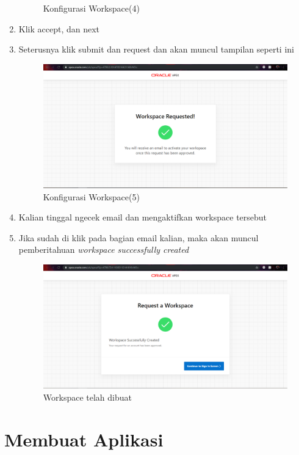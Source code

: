 \documentclass{article}
\begin{document}
\begin{enumerate}
\begin{figure}[!htbp]
        \caption{Konfigurasi Workspace(4)}
    \end{figure}
\newpage
    \item Klik accept, dan next
    \item Seterusnya klik submit dan request dan akan muncul tampilan seperti ini
    \begin{figure}[!htbp]
        \centering
        \includegraphics[scale=0.3]{figure/6.PNG}
        \caption{Konfigurasi Workspace(5)}
    \end{figure}
    \item Kalian tinggal ngecek email dan mengaktifkan workspace tersebut
    \item Jika sudah di klik pada bagian email kalian, maka akan muncul pemberitahuan \textit{workspace successfully created}
    \begin{figure}[!htbp]
        \centering
        \includegraphics[scale=0.3]{figure/7.PNG}
        \caption{Workspace telah dibuat}
    \end{figure}
\end{enumerate}
\newpage
\section{Membuat Aplikasi}
\end{document}
